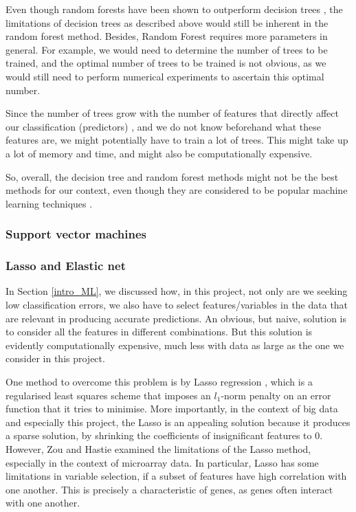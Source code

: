 \documentclass[12pt, twoside, a4paper]{article}
\begin{document}
Even though random forests have been shown to outperform decision trees \cite{RefWorks:103}, the limitations of decision trees as described above would still be inherent in the random forest method. Besides, Random Forest requires more parameters in general. For example, we would need to determine the number of trees to be trained, and the optimal number of trees to be trained is not obvious, as we would still need to perform numerical experiments to ascertain this optimal number.

Since the number of trees grow with the number of features that directly affect our classification (predictors) \cite{RefWorks:102}, and we do not know beforehand what these features are, we might potentially have to train a lot of trees. This might take up a lot of memory and time, and might also be computationally expensive.

So, overall, the decision tree and random forest methods might not be the best methods for our context, even though they are considered to be popular machine learning techniques \cite{RefWorks:103}.

\subsubsection{Support vector machines}

\subsubsection{Lasso and Elastic net}
In Section \ref{intro_ML}, we discussed how, in this project, not only are we seeking low classification errors, we also have to select features/variables in the data that are relevant in producing accurate predictions. An obvious, but naive, solution is to consider all the features in different combinations. But this solution is evidently computationally expensive, much less with data as large as the one we consider in this project.

One method to overcome this problem is by Lasso regression \cite{RefWorks:94}, which is a regularised least squares scheme that imposes an $l_1$-norm penalty on an error function that it tries to minimise. More importantly, in the context of big data and especially this project, the Lasso is an appealing solution because it produces a sparse solution, by shrinking the coefficients of insignificant features to 0. However, Zou and Hastie \cite{RefWorks:96} examined the limitations of the Lasso method, especially in the context of microarray data. In particular, Lasso has some limitations in variable selection, if a subset of features have high correlation with one another. This is precisely a characteristic of genes, as genes often interact with one another.
\end{document}
